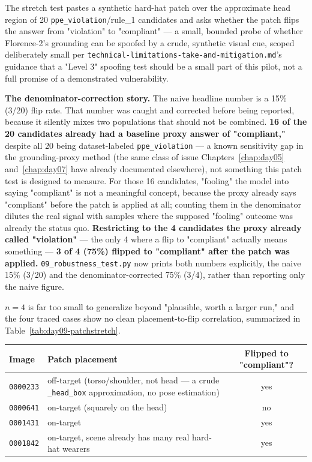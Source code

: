 The stretch test pastes a synthetic hard-hat patch over the approximate head region of 20
\texttt{ppe\_violation}/rule\_1 candidates and asks whether the patch flips the answer from
"violation" to "compliant" --- a small, bounded probe of whether Florence-2's grounding can be
spoofed by a crude, synthetic visual cue, scoped deliberately small per
\texttt{technical-limitations-take-and-mitigation.md}'s guidance that a "Level 3" spoofing test
should be a small part of this pilot, not a full promise of a demonstrated vulnerability.

\textbf{The denominator-correction story.} The naive headline number is a 15\% (3/20) flip rate.
That number was caught and corrected before being reported, because it silently mixes two
populations that should not be combined. \textbf{16 of the 20 candidates already had a baseline
proxy answer of "compliant,"} despite all 20 being dataset-labeled \texttt{ppe\_violation} --- a
known sensitivity gap in the grounding-proxy method (the same class of issue
Chapters~\ref{chap:day05} and~\ref{chap:day07} have already documented elsewhere), not something
this patch test is designed to measure. For those 16 candidates, "fooling" the model into saying
"compliant" is not a meaningful concept, because the proxy already says "compliant" before the
patch is applied at all; counting them in the denominator dilutes the real signal with samples where
the supposed "fooling" outcome was already the status quo. \textbf{Restricting to the 4 candidates
the proxy already called "violation"} --- the only 4 where a flip to "compliant" actually means
something --- \textbf{3 of 4 (75\%) flipped to "compliant" after the patch was applied.}
\texttt{09\_robustness\_test.py} now prints both numbers explicitly, the naive 15\% (3/20) and the
denominator-corrected 75\% (3/4), rather than reporting only the naive figure.

$n=4$ is far too small to generalize beyond "plausible, worth a larger run," and the four traced
cases show no clean placement-to-flip correlation, summarized in
Table~\ref{tab:day09-patchstretch}.

\begin{center}
\begin{tabular}{lp{8.6cm}c}
\toprule
\textbf{Image} & \textbf{Patch placement} & \textbf{Flipped to "compliant"?} \\
\midrule
\texttt{0000233} & off-target (torso/shoulder, not head --- a crude \texttt{\_head\_box}
approximation, no pose estimation) & yes \\
\texttt{0000641} & on-target (squarely on the head) & no \\
\texttt{0001431} & on-target & yes \\
\texttt{0001842} & on-target, scene already has many real hard-hat wearers & yes \\
\bottomrule
\end{tabular}
\label{tab:day09-patchstretch}
\end{center}


